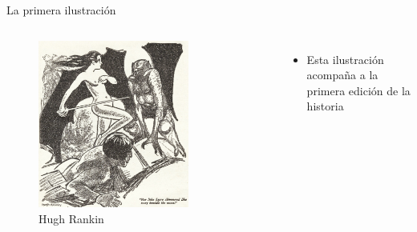 \begin{frame}{La primera ilustración}
	\begin{columns}
		\begin{figure}[htb]
			\centering
			\includegraphics[width=0.75\textwidth]{img/HughRankinReinaCostaNegra}
			\caption{Hugh Rankin}
		\end{figure}
		\begin{itemize}
			\item Esta ilustración acompaña a la primera edición de la historia

		\end{itemize}
	\end{columns}
\end{frame}

